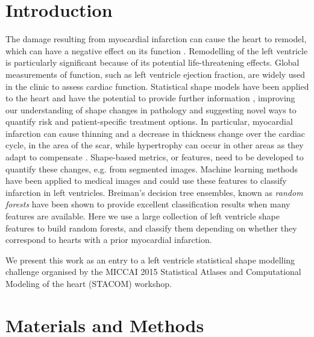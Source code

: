 \documentclass{llncs}
\begin{document}
\section{Introduction}
The damage resulting from myocardial infarction can cause the heart to remodel, which can have a negative effect on its function \cite{Sutton2000}. Remodelling of the left ventricle is particularly significant because of its potential life-threatening effects. 
Global measurements of function, such as left ventricle ejection fraction, are widely used in the clinic to assess cardiac function. Statistical shape models \cite{Cootes1992} have been applied to the heart and have the potential to provide further information \cite{Lewandowski2012,Young2009,Lorenz2006}, improving our understanding of shape changes in pathology and suggesting novel ways to quantify risk and patient-specific treatment options. In particular, myocardial infarction can cause thinning and a decrease in thickness change over the cardiac cycle, in the area of the scar, while hypertrophy can occur in other areas as they adapt to compensate \cite{Sutton2000}. Shape-based metrics, or features, need to be developed to quantify these changes, e.g. from segmented images. Machine learning methods have been applied to medical images \cite{Mantilla2013,Wernick2010} and could use these features to classify infarction in left ventricles. Breiman's decision tree ensembles, known as \emph{random forests} \cite{Breiman2001} have been shown to provide excellent classification results when many features are available. Here we use a large collection of left ventricle shape features to build random forests, and classify them depending on whether they correspond to hearts with a prior myocardial infarction.

We present this work as an entry to a left ventricle statistical shape modelling challenge organised by the MICCAI 2015 Statistical Atlases and Computational Modeling of the heart (STACOM) workshop.


\section{Materials and Methods}
\end{document}
